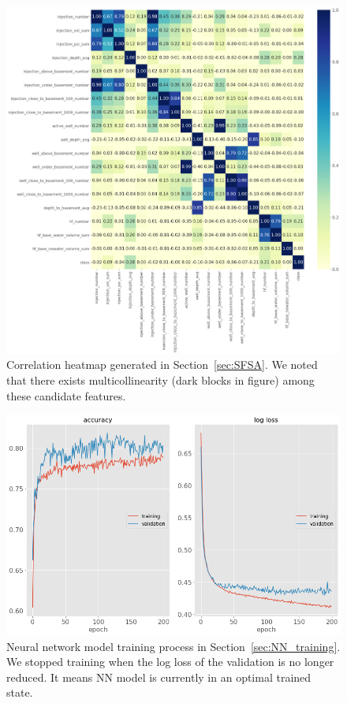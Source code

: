 \documentclass[final-report]{report-template}
\begin{document}
\begin{figure}[H]
    \begin{center}
        \includegraphics[width=1\textwidth]{heatmap_all.png}
    \end{center}
    \caption{\label{fig:heatmap} Correlation heatmap generated in Section~\ref{sec:SFSA}. We noted that there exists multicollinearity (dark blocks in figure) among these candidate features.}
\end{figure}

\begin{figure}[H]
    \begin{center}
        \includegraphics[width=1\textwidth]{training_process.png}
    \end{center}
    \caption{\label{fig:training_process} Neural network model training process in Section~\ref{sec:NN_training}. We stopped training when the log loss of the validation is no longer reduced. It means NN model is currently in an optimal trained state.}
\end{figure}
\end{document}
